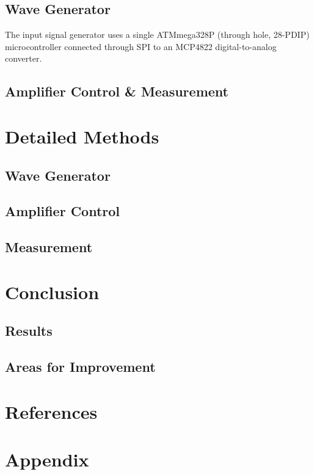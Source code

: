 \documentclass[10pt, twocolumn]{article}
\theoremstyle{definition}
\begin{document}
\subsection{Wave Generator}
The input signal generator uses a single ATMmega328P \cite{microchip:ATmega328P} (through hole, 28-PDIP) microcontroller connected through SPI
to an MCP4822\cite{microchip:MCP4822} digital-to-analog converter.
\subsection{Amplifier Control \& Measurement}
\section{Detailed Methods}
\subsection{Wave Generator}
\subsection{Amplifier Control}
\subsection{Measurement}
\section{Conclusion}
\subsection{Results}
\subsection{Areas for Improvement}
\section{References}
{}

\section{Appendix}
\end{document}

